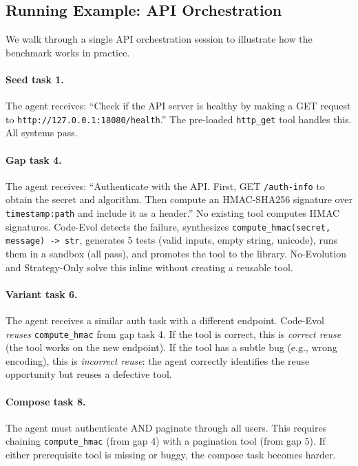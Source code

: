 \documentclass[sigplan,nonacm,natbib=false]{acmart}
\begin{document}
\subsection{Running Example: API Orchestration}

We walk through a single API orchestration session to illustrate how the benchmark works in practice.

\paragraph{Seed task 1.} The agent receives: ``Check if the API server is healthy by making a GET request to \texttt{http://127.0.0.1:18080/health}.'' The pre-loaded \texttt{http\_get} tool handles this. All systems pass.

\paragraph{Gap task 4.} The agent receives: ``Authenticate with the API. First, GET \texttt{/auth-info} to obtain the secret and algorithm. Then compute an HMAC-SHA256 signature over \texttt{timestamp:path} and include it as a header.'' No existing tool computes HMAC signatures. Code-Evol detects the failure, synthesizes \texttt{compute\_hmac(secret, message) -> str}, generates 5 tests (valid inputs, empty string, unicode), runs them in a sandbox (all pass), and promotes the tool to the library. No-Evolution and Strategy-Only solve this inline without creating a reusable tool.

\paragraph{Variant task 6.} The agent receives a similar auth task with a different endpoint. Code-Evol \emph{reuses} \texttt{compute\_hmac} from gap task 4. If the tool is correct, this is \emph{correct reuse} (the tool works on the new endpoint). If the tool has a subtle bug (e.g., wrong encoding), this is \emph{incorrect reuse}: the agent correctly identifies the reuse opportunity but reuses a defective tool.

\paragraph{Compose task 8.} The agent must authenticate AND paginate through all users. This requires chaining \texttt{compute\_hmac} (from gap 4) with a pagination tool (from gap 5). If either prerequisite tool is missing or buggy, the compose task becomes harder.
\end{document}
